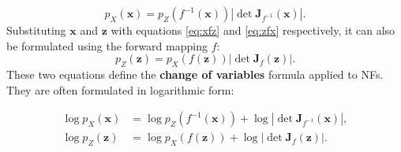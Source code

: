 \begin{equation}
    \label{eq:xnfz}
    p_X(\boldsymbol{x}) = p_Z(f^{-1}(\boldsymbol{x}))\left|\det\boldsymbol{J}_{f^{-1}}(\boldsymbol{x})\right|.
\end{equation}
Substituting $\boldsymbol{x}$ and $\boldsymbol{z}$ with equations \ref{eq:xfz} and \ref{eq:zfx} respectively, it can also be formulated using the forward mapping $f$:
\begin{equation}
    \label{eq:znfx}
    p_Z(\boldsymbol{z}) = p_X(f(\boldsymbol{z}))\left|\det\boldsymbol{J}_f(\boldsymbol{z})\right|.
\end{equation}
These two equations define the \textbf{change of variables} formula applied to \acp{NF}. They are often formulated in logarithmic form:
\begin{mdframed}[nobreak=true,innertopmargin=-4pt,innerbottommargin=4pt,innerleftmargin=6pt,innerrightmargin=6pt]
    \begin{align}
        \label{eq:nfchangeofvariables}
        \log p_X(\boldsymbol{x}) &= \log p_Z(f^{-1}(\boldsymbol{x}))+\log\left|\det\boldsymbol{J}_{f^{-1}}(\boldsymbol{x})\right|,\\
        \log p_Z(\boldsymbol{z}) &= \log p_X(f(\boldsymbol{z}))+\log\left|\det\boldsymbol{J}_f(\boldsymbol{z})\right|.
    \end{align}
\end{mdframed}


